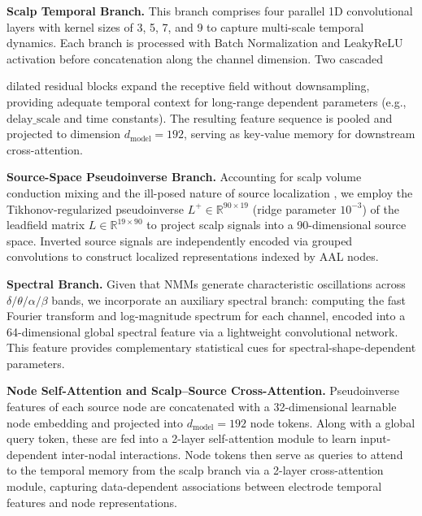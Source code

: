 \documentclass{article}
\begin{document}
\textbf{Scalp Temporal Branch.} This branch comprises four parallel 1D convolutional layers with kernel sizes of 3, 5, 7, and 9 to capture multi-scale temporal dynamics. Each branch is processed with Batch Normalization \citep{ioffe2015batch} and LeakyReLU activation \citep{maas2013rectifier} before concatenation along the channel dimension. Two cascaded {dilated residual blocks expand the receptive field without downsampling, providing adequate temporal context for long-range dependent parameters (e.g., $\mathrm{delay\_scale}$ and time constants). The resulting feature sequence is pooled and projected to dimension $d_{\text{model}}=192$, serving as key-value memory for downstream cross-attention.

\textbf{Source-Space Pseudoinverse Branch.} Accounting for scalp volume conduction mixing and the ill-posed nature of source localization \citep{grech2008review,michel2019eegsource}, we employ the Tikhonov-regularized pseudoinverse $L^{+}\in\mathbb{R}^{90\times19}$ (ridge parameter $10^{-3}$) of the leadfield matrix $L\in\mathbb{R}^{19\times90}$ to project scalp signals into a 90-dimensional source space. Inverted source signals are independently encoded via grouped convolutions to construct localized representations indexed by AAL nodes.

\textbf{Spectral Branch.} Given that NMMs generate characteristic oscillations across $\delta/\theta/\alpha/\beta$ bands, we incorporate an auxiliary spectral branch: computing the fast Fourier transform and log-magnitude spectrum for each channel, encoded into a 64-dimensional global spectral feature via a lightweight convolutional network. This feature provides complementary statistical cues for spectral-shape-dependent parameters.

\textbf{Node Self-Attention and Scalp--Source Cross-Attention.} Pseudoinverse features of each source node are concatenated with a 32-dimensional learnable node embedding and projected into $d_{\text{model}}=192$ node tokens. Along with a global query token, these are fed into a 2-layer self-attention module to learn input-dependent inter-nodal interactions. Node tokens then serve as queries to attend to the temporal memory from the scalp branch via a 2-layer cross-attention module, capturing data-dependent associations between electrode temporal features and node representations.

}
\end{document}
